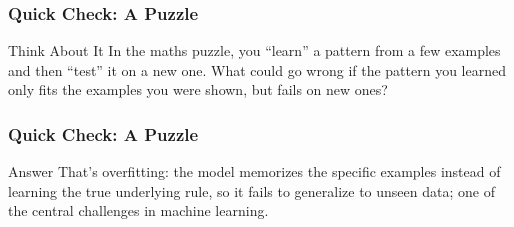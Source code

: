 %





\begin{frame}[fragile]\frametitle{Quick Check: A Puzzle}
\begin{block}{Think About It}
In the maths puzzle, you ``learn'' a pattern from a few examples and then ``test'' it on a new one. What could go wrong if the pattern you learned only fits the examples you were shown, but fails on new ones?
\end{block}
\end{frame}

\begin{frame}[fragile]\frametitle{Quick Check: A Puzzle}
\begin{block}{Answer}
That's overfitting: the model memorizes the specific examples instead of learning the true underlying rule, so it fails to generalize to unseen data; one of the central challenges in machine learning.
\end{block}
\end{frame}

